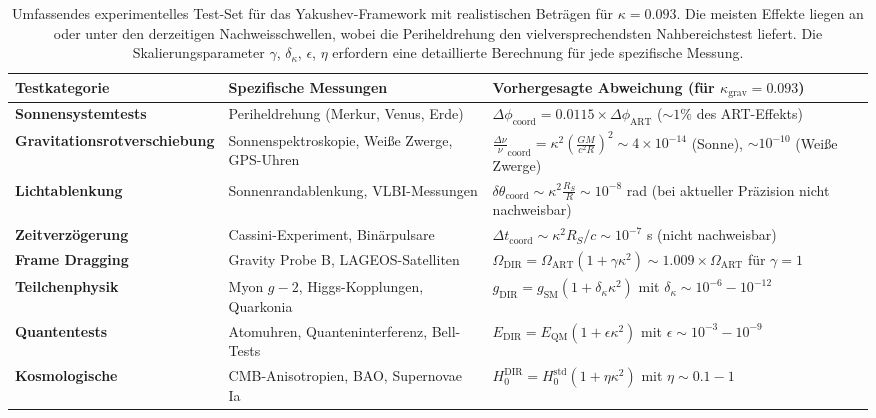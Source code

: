 \documentclass[11pt,a4paper]{article}
\begin{document}
	\begin{table}[htbp]
		\centering
		\scriptsize
		\begin{tabular}{p{}p{}p{}}
			\toprule
			\textbf{Testkategorie} & \textbf{Spezifische Messungen} & \textbf{Vorhergesagte Abweichung (für $\kappa_{\text{grav}} = 0.093$)} \\
			\midrule
			\textbf{Sonnensystemtests} & 
			Periheldrehung (Merkur, Venus, Erde) &
			$\Delta\phi_{\text{coord}} = 0.0115 \times \Delta\phi_{\text{ART}}$ ($\sim 1\%$ des ART-Effekts) \\
			\hline
			\textbf{Gravitationsrotverschiebung} &
			Sonnenspektroskopie, Weiße Zwerge, GPS-Uhren &
			$\frac{\Delta\nu}{\nu}_{\text{coord}} = \kappa^2\left(\frac{GM}{c^2R}\right)^2 \sim 4\times10^{-14}$ (Sonne), $\sim 10^{-10}$ (Weiße Zwerge) \\
			\hline
			\textbf{Lichtablenkung} &
			Sonnenrandablenkung, VLBI-Messungen &
			$\delta\theta_{\text{coord}} \sim \kappa^2 \frac{R_S}{R} \sim 10^{-8}$ rad (bei aktueller Präzision nicht nachweisbar) \\
			\hline
			\textbf{Zeitverzögerung} &
			Cassini-Experiment, Binärpulsare &
			$\Delta t_{\text{coord}} \sim \kappa^2 R_S/c \sim 10^{-7}$ s (nicht nachweisbar) \\
			\hline
			\textbf{Frame Dragging} &
			Gravity Probe B, LAGEOS-Satelliten &
			$\Omega_{\text{DIR}} = \Omega_{\text{ART}} (1 + \gamma \kappa^2) \sim 1.009 \times \Omega_{\text{ART}}$ für $\gamma=1$ \\
			\hline
			\textbf{Teilchenphysik} &
			Myon $g-2$, Higgs-Kopplungen, Quarkonia &
			$g_{\text{DIR}} = g_{\text{SM}} (1 + \delta_\kappa \kappa^2)$ mit $\delta_\kappa \sim 10^{-6} - 10^{-12}$ \\
			\hline
			\textbf{Quantentests} &
			Atomuhren, Quanteninterferenz, Bell-Tests &
			$E_{\text{DIR}} = E_{\text{QM}} (1 + \epsilon \kappa^2)$ mit $\epsilon \sim 10^{-3} - 10^{-9}$ \\
			\hline
			\textbf{Kosmologische} &
			CMB-Anisotropien, BAO, Supernovae Ia &
			$H_0^{\text{DIR}} = H_0^{\text{std}} (1 + \eta \kappa^2)$ mit $\eta \sim 0.1 - 1$ \\
			\bottomrule
		\end{tabular}
		\caption{Umfassendes experimentelles Test-Set für das Yakushev-Framework mit realistischen Beträgen für $\kappa = 0.093$. Die meisten Effekte liegen an oder unter den derzeitigen Nachweisschwellen, wobei die Periheldrehung den vielversprechendsten Nahbereichstest liefert. Die Skalierungsparameter $\gamma$, $\delta_\kappa$, $\epsilon$, $\eta$ erfordern eine detaillierte Berechnung für jede spezifische Messung.}
	\end{table}
	
\end{document}
